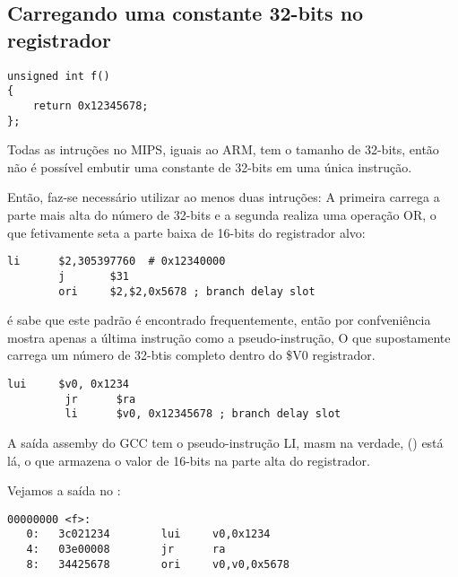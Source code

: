 ﻿\subsection{Carregando uma constante 32-bits no registrador}
\label{MIPS_big_constants}

\begin{lstlisting}[style=customc]
unsigned int f()
{
	return 0x12345678;
};
\end{lstlisting}

Todas as intruções no MIPS, iguais ao ARM, tem o tamanho de 32-bits, então não é possível embutir uma constante de 32-bits em uma única instrução.

Então, faz-se necessário utilizar ao menos duas intruções:
A primeira carrega a parte mais alta do número de 32-bits e a segunda realiza uma operação OR, o que fetivamente seta a parte baixa de 16-bits do registrador alvo:

\begin{lstlisting}[caption=GCC 4.4.5 -O3 (\assemblyOutput),style=customasmMIPS]
        li      $2,305397760  # 0x12340000
        j       $31
        ori     $2,$2,0x5678 ; branch delay slot
\end{lstlisting}

\IDA é sabe que este padrão é encontrado frequentemente, então por confveniência mostra apenas a última  instrução como a  pseudo-instrução,
O que supostamente carrega um número de 32-btis completo dentro do \$V0 registrador.


\begin{lstlisting}[caption=GCC 4.4.5 -O3 (IDA),style=customasmMIPS]
         lui     $v0, 0x1234
         jr      $ra
         li      $v0, 0x12345678 ; branch delay slot
\end{lstlisting}

A saída assemby do GCC tem o pseudo-instrução LI, masm na verdade,  () está lá,
o que armazena o valor de 16-bits na parte alta do registrador.

Vejamos a saída no :

\begin{lstlisting}[caption=objdump,style=customasmMIPS]
00000000 <f>:
   0:   3c021234        lui     v0,0x1234
   4:   03e00008        jr      ra
   8:   34425678        ori     v0,v0,0x5678
\end{lstlisting}

